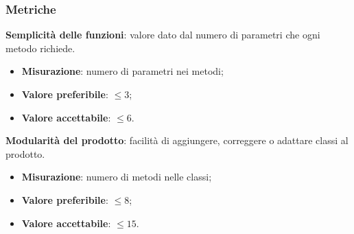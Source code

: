         \subsubsection{Metriche}
            \textbf{Semplicità delle funzioni}: valore dato dal numero di parametri che ogni metodo richiede.
                \begin{itemize}
                    \item \textbf{Misurazione}: numero di parametri nei metodi;
                    \item \textbf{Valore preferibile}: $\leq 3$;
                    \item \textbf{Valore accettabile}: $\leq 6$.
                \end{itemize}
            \textbf{Modularità del prodotto}: facilità di aggiungere, correggere o adattare classi al prodotto\glo.
                \begin{itemize}
                    \item \textbf{Misurazione}: numero di metodi nelle classi;
                    \item \textbf{Valore preferibile}: $\leq 8$;
                    \item \textbf{Valore accettabile}: $\leq 15$.
                \end{itemize}

